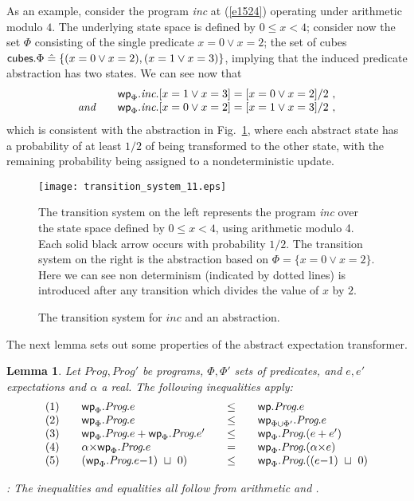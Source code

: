 \documentclass[numbers,copyright,creativecommons]{eptcs}
\newcommand{\Eqn}[1]{(\ref{#1})}
\newcommand{\figg}[1]{Fig.~\ref{#1}}
\newcommand{\cubes}{\mbox{\sf cubes}}
\newcommand{\Wp}{\mbox{\sf wp}}
\newcommand{\Max}{~\sqcup~}
\newcommand{\Prog}{\textit{Prog}}
\newcommand{\Defs}{\mathrel{\hat{=}}}
\newcommand{\Wide}[1]{~~~#1~~~}
\newtheorem{Lems}{Lemma} \newcommand{\Lem}[1]{Lem.~\ref{#1}}
\newcommand{\Proof}{\noindent{\bf Proof}: \quad}
\begin{document}
As an example, consider the program  \textit{inc} at \Eqn{e1524} operating under arithmetic modulo $4$. The underlying state space is defined by $0 \leq x < 4$; consider now the set  $\Phi$ consisting of the single predicate $x=0 \lor x=2$; the set of cubes $\cubes.\Phi \Defs \{(x=0 \lor x=2), (x=1 \lor x=3)\}$, implying that the induced predicate abstraction has two states. We can see now that
\[
\begin{array}{ll}
&\Wp_\Phi.\textit{inc}.[x=1 \lor x=3] = [x=0\lor x=2]/2~, \\
 \textit{and}~~~ &  \Wp_\Phi.\textit{inc}.[x=0 \lor x=2] = [x=1\lor x=3]/2~,
 \end{array}
\]
which is consistent with the abstraction in \figg{f1414}, where each abstract state has a probability of at least $1/2$ of
being transformed to the other state, with the remaining probability being assigned to a nondeterministic update.
\begin{figure}
\begin{center}
\texttt{[image: transition\_system\_11.eps]}
\end{center}

\small{The transition system on the left represents the program \textit{inc} over the state space defined by $0 \leq x < 4$, using arithmetic modulo 4. Each solid black arrow occurs with probability $1/2$. The transition system on the right is the abstraction based on $\Phi = \{x=0 \lor x=2\}$. Here we can see non determinism (indicated by dotted lines) is introduced after any transition which divides the value of $x$ by $2$.}
\caption{The transition system for $\textit{inc}$ and an abstraction.}\label{f1414}
\end{figure}

The next lemma sets out some properties of the abstract expectation transformer.

\begin{Lems}\label{l1541}
Let $\Prog, \Prog'$ be  programs, $\Phi, \Phi'$  sets of predicates, and $e, e'$ expectations and $\alpha$ a real. The following inequalities apply:
\[
\begin{array}{llll}
(1)~~~ & \Wp_\Phi.\Prog.e & \Wide{\leq}& \Wp.\Prog.e\\

(2)~~~ &  \Wp_{\Phi} . \Prog.e &\Wide{\leq}& \Wp_{\Phi \cup \Phi'}.\Prog.e\\

(3)~~~ & \Wp_\Phi.\Prog.e + \Wp_\Phi.\Prog.e' &\Wide{\leq}& \Wp_\Phi.\Prog.(e + e')  \\
(4)~~~ & \alpha{\times}\Wp_\Phi.\Prog.e  &\Wide{=}& \Wp_\Phi.\Prog.(\alpha{\times}e)  \\

(5) ~~~ &(\Wp_\Phi.\Prog.e{-}1)\Max 0)  &\Wide{\leq}& \Wp_\Phi.\Prog.((e{-}1)\Max 0)  \\

\end{array}
\]

\Proof
The inequalities and equalities all follow from arithmetic and .
\end{Lems}
\end{document}

